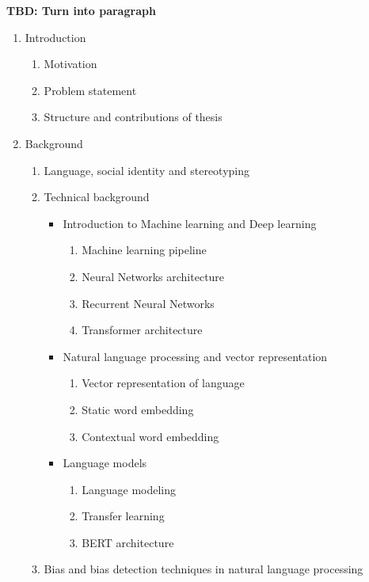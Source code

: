 \textbf{TBD: Turn into paragraph}
\begin{enumerate}
    \item Introduction
        \begin{enumerate}
            \item Motivation
            \item Problem statement
            \item Structure and contributions of thesis
        \end{enumerate}
    \item Background
        \begin{enumerate}
        \item Language, social identity and stereotyping
        \item Technical background
        \begin{itemize}
            \item Introduction to Machine learning and Deep learning 
                \begin{enumerate}
                    \item Machine learning pipeline
                    \item Neural Networks architecture
                    \item Recurrent Neural Networks
                    \item Transformer architecture
                \end{enumerate}
            \item Natural language processing and vector representation
                \begin{enumerate}
                    \item Vector representation of language 
                    \item Static word embedding
                    \item Contextual word embedding
                \end{enumerate}
            \item Language models
                \begin{enumerate}
                    \item Language modeling
                    \item Transfer learning
                    \item BERT architecture
                \end{enumerate}
        \end{itemize}
            \item Bias and bias detection techniques in natural language processing

\end{enumerate}
\end{enumerate}
